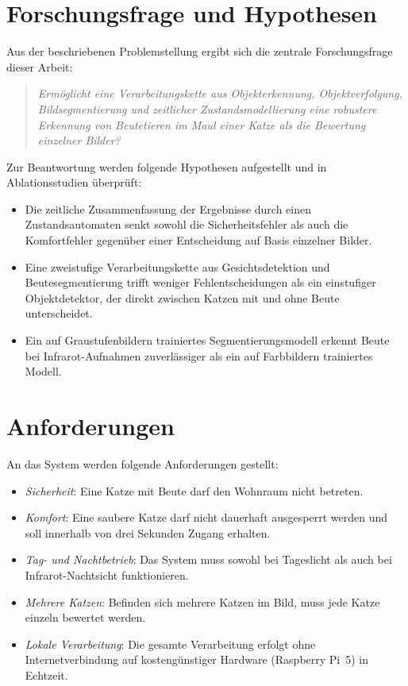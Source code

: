 \section{Forschungsfrage und Hypothesen}
\label{sec:forschungsfrage}
Aus der beschriebenen Problemstellung ergibt sich die zentrale Forschungsfrage dieser Arbeit:

\begin{quote}
\emph{Ermöglicht eine Verarbeitungskette aus Objekterkennung, Objektverfolgung, Bildsegmentierung und zeitlicher Zustandsmodellierung eine robustere Erkennung von Beutetieren im Maul einer Katze als die Bewertung einzelner Bilder?}
\end{quote}

Zur Beantwortung werden folgende Hypothesen aufgestellt und in Ablationsstudien überprüft:

\begin{itemize}
	\item[\textbf{H1:}] Die zeitliche Zusammenfassung der Ergebnisse durch einen Zustandsautomaten senkt sowohl die Sicherheitsfehler als auch die Komfortfehler gegenüber einer Entscheidung auf Basis einzelner Bilder.
	\item[\textbf{H2:}] Eine zweistufige Verarbeitungskette aus Gesichtsdetektion und Beutesegmentierung trifft weniger Fehlentscheidungen als ein einstufiger Objektdetektor, der direkt zwischen Katzen mit und ohne Beute unterscheidet.
	\item[\textbf{H3:}] Ein auf Graustufenbildern trainiertes Segmentierungsmodell erkennt Beute bei Infrarot-Aufnahmen zuverlässiger als ein auf Farbbildern trainiertes Modell.
\end{itemize}

\section{Anforderungen}
\label{sec:anforderungen}
An das System werden folgende Anforderungen gestellt:

\begin{itemize}
	\item \emph{Sicherheit}: Eine Katze mit Beute darf den Wohnraum nicht betreten.
	\item \emph{Komfort}: Eine saubere Katze darf nicht dauerhaft ausgesperrt werden und soll innerhalb von drei Sekunden Zugang erhalten.
	\item \emph{Tag- und Nachtbetrieb}: Das System muss sowohl bei Tageslicht als auch bei Infrarot-Nachtsicht funktionieren.
	\item \emph{Mehrere Katzen}: Befinden sich mehrere Katzen im Bild, muss jede Katze einzeln bewertet werden.
	\item \emph{Lokale Verarbeitung}: Die gesamte Verarbeitung erfolgt ohne Internetverbindung auf kostengünstiger Hardware (Raspberry Pi~5) in Echtzeit.
\end{itemize}

